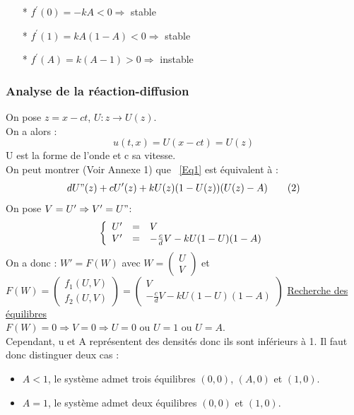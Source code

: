 \documentclass[a4paper,11pt]{article}
\begin{document}
\begin{itemize}
    	\item[*] $f^\prime(0)=-kA <0 \Rightarrow $ stable
        \item[*] $f^\prime(1)=kA(1-A) <0 \Rightarrow $ stable
        \item[*] $f^\prime(A)=k(A-1) >0 \Rightarrow $ instable
	\end{itemize}

\subsubsection{Analyse de la réaction-diffusion}
\noindent On pose $z=x-ct$, $U:z\rightarrow U(z)$.\\
On a alors : 
\begin{equation}
u(t,x)=U(x-ct)=U(z)
\tag{1}
\label{Eq1}
\end{equation}
U est la forme de l'onde et c sa vitesse.\\
On peut montrer (Voir Annexe 1) que ~\eqref{Eq1} est équivalent à :
\begin{equation}
dU"(z)+cU'(z)+kU(z)(1-U(z))(U(z)-A)
\tag{2}
\end{equation} 
On pose $V=U' \Rightarrow V'=U"$:
\[
\left\{
\begin{array}{r c l}
U' &=& V\\
V' &=& -\frac{c}{d}V-kU(1-U)(1-A)
\end{array}
\right.
\]
On a donc : $W'=F(W)$ avec $W=\begin{pmatrix} U \\ V \end{pmatrix}$ et $F(W)=\begin{pmatrix} f_1(U,V) \\ f_2(U,V) \end{pmatrix}=\begin{pmatrix} V \\ -\frac{c}{d}V-kU(1-U)(1-A) \end{pmatrix}$
\newline
\newline
\underline{Recherche des équilibres}\\
$F(W)=0 \Rightarrow V=0 \Rightarrow U=0 \text{ ou } U=1 \text{ ou } U=A$.\\
Cependant, u et A représentent des densités donc ils sont inférieurs à 1. Il faut donc distinguer deux cas :
\begin{itemize}
	\item $A<1$, le système admet trois équilibres $(0,0)$, $(A,0)$ et $(1,0)$.
    \item $A=1$, le système admet deux équilibres $(0,0)$ et $(1,0)$.
\end{itemize}
\end{document}
